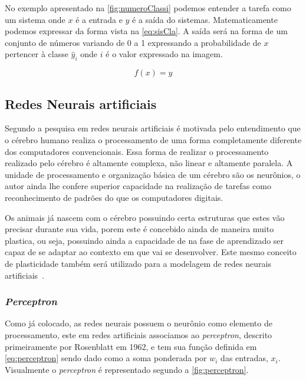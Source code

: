 \documentclass[
    12pt,
    oneside,
    a4paper,
    english,
    brazil
]{abntex2}
\begin{document}
No exemplo apresentado na  \autoref{fig:numeroClassi} podemos entender a tarefa
como  um sistema  onde $x$  é a  entrada  e $\hat{y}$  é a  saída do  sistemas.
Matematicamente  podemos expressar  da  forma vista  na \autoref{eq:sisCla}.  A
saída será na forma  de um conjunto de números variando de 0  a 1 expressando a
probabilidade  de  $x$ pertencer  à  classe  $\hat{y}_i$  onde  $i$ é  o  valor
expressado na imagem.

\begin{equation}
    \label{eq:sisCla}
    f(x) = \hat{y}
\end{equation}

\subsection{Redes Neurais artificiais}

Segundo    a pesquisa  em  redes  neurais artificiais  é
motivada pelo entendimento que o cérebro  humano realiza o processamento de uma
forma  completamente diferente  dos computadores  convencionais. Essa  forma de
realizar  o processamento  realizado  pelo cérebro  é  altamente complexa,  não
linear e altamente paralela. A unidade de processamento e organização básica de
um cérebro são  os neurônios, o autor ainda lhe  confere superior capacidade na
realização de  tarefas como  reconhecimento de padrões  do que  os computadores
digitais.

Os animais  já nascem com  o cérebro possuindo  certa estruturas que  estes vão
precisar  durante sua  vida,  porem este  é concebido  ainda  de maneira  muito
plastica, ou seja,  possuindo ainda a capacidade de na  fase de aprendizado ser
capaz de se adaptar ao contexto em  que vai se desenvolver. Este mesmo conceito
de  plasticidade  também será  utilizado  para  a  modelagem de  redes  neurais
artificiais~\cite{haykin2009}.

\subsubsection{\textit{Perceptron}}

Como  já  colocado, as  redes  neurais  possuem  o  neurônio como  elemento  de
processamento,  este em  redes artificiais  associamos ao  \textit{perceptron},
descrito primeiramente  por Rosenblatt em  1962, e  tem sua função  definida em
\autoref{eq:perceptron}  sendo  dado  como  a  soma  ponderada  por  $w_i$  das
entradas,  $x_i$. Visualmente  o \textit{perceptron}  é representado  segundo a
\autoref{fig:perceptron}.
\end{document}
